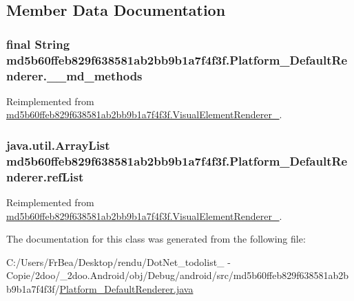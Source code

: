 \subsection{Member Data Documentation}
\hypertarget{classmd5b60ffeb829f638581ab2bb9b1a7f4f3f_1_1_platform___default_renderer_f4577cee8cad226436d0bce948786b98}{
\subsubsection[{\_\-\_\-md\_\-methods}]{\setlength{\rightskip}{0pt plus 5cm}final String {\bf md5b60ffeb829f638581ab2bb9b1a7f4f3f.Platform\_\-DefaultRenderer.\_\-\_\-md\_\-methods}}}
\label{classmd5b60ffeb829f638581ab2bb9b1a7f4f3f_1_1_platform___default_renderer_f4577cee8cad226436d0bce948786b98}




Reimplemented from \hyperlink{classmd5b60ffeb829f638581ab2bb9b1a7f4f3f_1_1_visual_element_renderer__1_4ef182bc984a4330ed789e1f0b0222d1}{md5b60ffeb829f638581ab2bb9b1a7f4f3f.VisualElementRenderer\_}.\hypertarget{classmd5b60ffeb829f638581ab2bb9b1a7f4f3f_1_1_platform___default_renderer_6a4513e1bfb8e75fe2e407dd4749c4f8}{
\subsubsection[{refList}]{\setlength{\rightskip}{0pt plus 5cm}java.util.ArrayList {\bf md5b60ffeb829f638581ab2bb9b1a7f4f3f.Platform\_\-DefaultRenderer.refList}}}
\label{classmd5b60ffeb829f638581ab2bb9b1a7f4f3f_1_1_platform___default_renderer_6a4513e1bfb8e75fe2e407dd4749c4f8}




Reimplemented from \hyperlink{classmd5b60ffeb829f638581ab2bb9b1a7f4f3f_1_1_visual_element_renderer__1_4ebd0e42ebd360712eb189930036fc9f}{md5b60ffeb829f638581ab2bb9b1a7f4f3f.VisualElementRenderer\_}.

The documentation for this class was generated from the following file:\begin{CompactItemize}
\item 
C:/Users/FrBea/Desktop/rendu/DotNet\_\-todolist\_ - Copie/2doo/\_\-2doo.Android/obj/Debug/android/src/md5b60ffeb829f638581ab2bb9b1a7f4f3f/\hyperlink{_platform___default_renderer_8java}{Platform\_\-DefaultRenderer.java}\end{CompactItemize}
